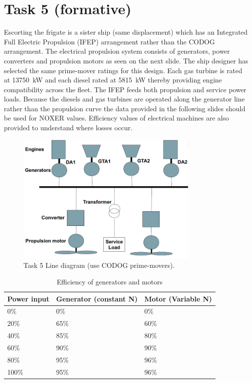 \section{Task 5 (formative)}
Escorting the frigate is a sister ship (same displacement) which has an Integrated Full Electric Propulsion (IFEP) arrangement rather than the CODOG arrangement. The electrical propulsion system consists of generators, power converters and propulsion motors as seen on the next slide. The ship designer has selected the same prime-mover ratings for this design. Each gas turbine is rated at \SI{13750}{\kilo\watt} and each diesel rated at \SI{5815}{\kilo\watt} thereby providing engine compatibility across the fleet. The IFEP feeds both propulsion and service power loads. Because the diesels and gas turbines are operated along the generator line rather than the propulsion curve the data provided in the following slides should be used for NOXER values. Efficiency values of electrical machines are also provided to understand where losses occur.
\begin{figure}[H]
    \centering
    \includegraphics[width = 0.8\textwidth]{img/figure73.png}
    \caption{Task 5 Line diagram (use CODOG prime-movers).}
\end{figure}
\begin{table}[H]
    \centering
    \begin{tabular}{@{}lll@{}}
        \toprule
        \textbf{Power input} & \textbf{Generator (constant N)} & \textbf{Motor (Variable N)} \\
        \midrule
        0\%                  & 0\%                             & 0\%                         \\
        20\%                 & 65\%                            & 60\%                        \\
        40\%                 & 85\%                            & 80\%                        \\
        60\%                 & 90\%                            & 90\%                        \\
        80\%                 & 95\%                            & 96\%                        \\
        100\%                & 95\%                            & 96\%                        \\
        \bottomrule
    \end{tabular}
    \caption{Efficiency of generators and motors}
\end{table}
